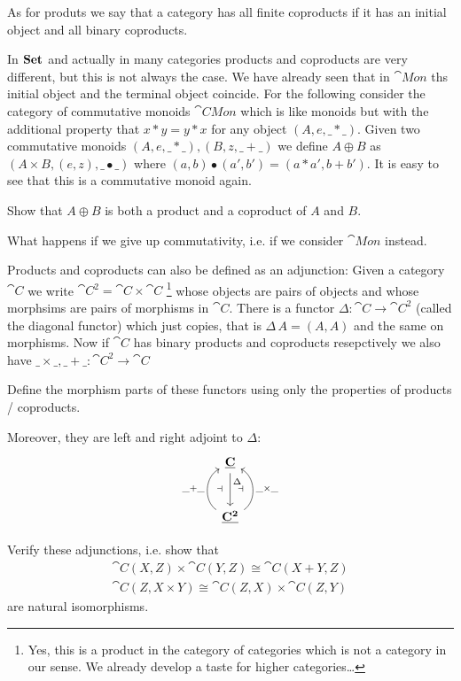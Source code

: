 As for produts we say that a category has all finite coproducts if it has an initial object and all binary coproducts.

In $\mathbf{Set}$ and actually in many categories products and coproducts are very different, but this is not always the case. We have already seen that in $\cat{Mon}$ ths initial object and the terminal object coincide. For the following consider the category of commutative monoids $\cat{CMon}$ which is like monoids but with the additional property that $x * y = y * x$ for any object $(A,e,\_*\_)$. Given two commutative monoids  $(A,e,\_*\_),  (B,z,\_+\_)$ we define $A \oplus B$ as $(A\times B,(e,z),\_ \bullet \_)$ where $(a,b) \bullet (a',b') = (a * a',b + b')$. It is easy to see that this is a commutative monoid again.
\begin{Exercise}
Show that $A \oplus B$ is both a product and a coproduct of $A$ and $B$.
\end{Exercise}
\begin{question}
  What happens if we give up commutativity, i.e. if we consider $\cat{Mon}$ instead.
\end{question}

Products and coproducts can also be defined as an adjunction: Given a category $\cat{C}$ we write $\cat{C^2} = \cat{C}\times\cat{C}$
\footnote{Yes, this is a product in the category of categories which is not a category in our sense. We already develop a taste for higher categories\dots}
whose objects are pairs of objects and whose morphsims are pairs of morphisms in $\cat{C}$. There is a functor $\Delta : \cat{C} \to \cat{C^2}$ (called the diagonal functor) which just copies, that is $\Delta\,A = (A,A)$ and the same on morphisms. Now if $\cat{C}$ has binary products and coproducts resepctively we also have $\_\times\_, \_+\_ : \cat{C^2} \to \cat{C}$
\begin{Exercise}
  Define the morphism parts of these functors using only the properties of products / coproducts.
\end{Exercise}
Moreover, they are left and right adjoint to $\Delta$:
\[\begin{tikzcd}[row sep=large]
\cat{C} \arrow[d,"\Delta" near start] \\ 
\cat{C^2} \arrow[u,bend left = 60,"\_+\_" left,"\dashv" right=5 ] \arrow[u,bend right = 60,"\_\times\_" right,"\dashv" left = 5]
\end{tikzcd}\]
\begin{Exercise}
  Verify these adjunctions, i.e. show that
  \begin{align*}
    \cat{C}(X,Z) \times \cat{C}(Y,Z) \cong \cat{C}(X + Y,Z) \\
    \cat{C}(Z, X\times Y) \cong \cat{C}(Z,X) \times \cat{C}(Z,Y)
  \end{align*}
  are natural isomorphisms. 
\end{Exercise}

